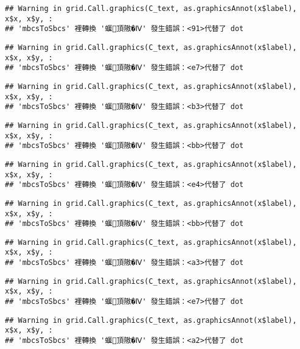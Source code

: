 \documentclass[
]{article}
\begin{document}
\begin{verbatim}
## Warning in grid.Call.graphics(C_text, as.graphicsAnnot(x$label), x$x, x$y, :
## 'mbcsToSbcs' 裡轉換 '蝘頂隞�Ⅳ' 發生錯誤：<91>代替了 dot
\end{verbatim}

\begin{verbatim}
## Warning in grid.Call.graphics(C_text, as.graphicsAnnot(x$label), x$x, x$y, :
## 'mbcsToSbcs' 裡轉換 '蝘頂隞�Ⅳ' 發生錯誤：<e7>代替了 dot
\end{verbatim}

\begin{verbatim}
## Warning in grid.Call.graphics(C_text, as.graphicsAnnot(x$label), x$x, x$y, :
## 'mbcsToSbcs' 裡轉換 '蝘頂隞�Ⅳ' 發生錯誤：<b3>代替了 dot
\end{verbatim}

\begin{verbatim}
## Warning in grid.Call.graphics(C_text, as.graphicsAnnot(x$label), x$x, x$y, :
## 'mbcsToSbcs' 裡轉換 '蝘頂隞�Ⅳ' 發生錯誤：<bb>代替了 dot
\end{verbatim}

\begin{verbatim}
## Warning in grid.Call.graphics(C_text, as.graphicsAnnot(x$label), x$x, x$y, :
## 'mbcsToSbcs' 裡轉換 '蝘頂隞�Ⅳ' 發生錯誤：<e4>代替了 dot
\end{verbatim}

\begin{verbatim}
## Warning in grid.Call.graphics(C_text, as.graphicsAnnot(x$label), x$x, x$y, :
## 'mbcsToSbcs' 裡轉換 '蝘頂隞�Ⅳ' 發生錯誤：<bb>代替了 dot
\end{verbatim}

\begin{verbatim}
## Warning in grid.Call.graphics(C_text, as.graphicsAnnot(x$label), x$x, x$y, :
## 'mbcsToSbcs' 裡轉換 '蝘頂隞�Ⅳ' 發生錯誤：<a3>代替了 dot
\end{verbatim}

\begin{verbatim}
## Warning in grid.Call.graphics(C_text, as.graphicsAnnot(x$label), x$x, x$y, :
## 'mbcsToSbcs' 裡轉換 '蝘頂隞�Ⅳ' 發生錯誤：<e7>代替了 dot
\end{verbatim}

\begin{verbatim}
## Warning in grid.Call.graphics(C_text, as.graphicsAnnot(x$label), x$x, x$y, :
## 'mbcsToSbcs' 裡轉換 '蝘頂隞�Ⅳ' 發生錯誤：<a2>代替了 dot
\end{verbatim}
\end{document}

